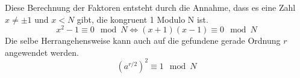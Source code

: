 Diese Berechnung der Faktoren entsteht durch die Annahme, dass es eine Zahl $x \neq \pm 1$ und $x < N$ gibt, die kongruent 1 Modulo N ist.
\begin{equation}
  \label{eqn:zero}
x^2-1 \equiv 0 \mod N \iff (x+1)(x-1) \equiv 0 \mod N
\end{equation}
Die selbe Herrangehensweise kann auch auf die gefundene gerade Ordnung $r$ angewendet werden.
\begin{equation}
  \left(a^{r/2}\right)^2 \equiv 1 \mod N
\end{equation}
